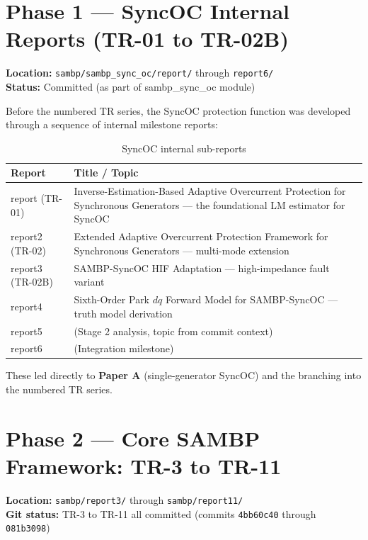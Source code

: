 \documentclass[11pt,a4paper]{article}
\begin{document}
\section{Phase 1 — SyncOC Internal Reports (TR-01 to TR-02B)}

\begin{phasebox}
\textbf{Location:} \texttt{sambp/sambp\_sync\_oc/report/} through \texttt{report6/}\\
\textbf{Status:} Committed (as part of sambp\_sync\_oc module)
\end{phasebox}

Before the numbered TR series, the SyncOC protection function was developed
through a sequence of internal milestone reports:

\begin{table}[h!]
\centering
\caption{SyncOC internal sub-reports}
\begin{tabular}{lp{10cm}}
\toprule
\textbf{Report} & \textbf{Title / Topic} \\
\midrule
report (TR-01) & Inverse-Estimation-Based Adaptive Overcurrent Protection for Synchronous Generators — the foundational LM estimator for SyncOC \\
report2 (TR-02) & Extended Adaptive Overcurrent Protection Framework for Synchronous Generators — multi-mode extension \\
report3 (TR-02B) & SAMBP-SyncOC HIF Adaptation — high-impedance fault variant \\
report4 & Sixth-Order Park $dq$ Forward Model for SAMBP-SyncOC — truth model derivation \\
report5 & (Stage 2 analysis, topic from commit context) \\
report6 & (Integration milestone) \\
\bottomrule
\end{tabular}
\end{table}

These led directly to \textbf{Paper A} (single-generator SyncOC) and the
branching into the numbered TR series.

\section{Phase 2 — Core SAMBP Framework: TR-3 to TR-11}

\begin{phasebox}
\textbf{Location:} \texttt{sambp/report3/} through \texttt{sambp/report11/}\\
\textbf{Git status:} TR-3 to TR-11 all committed (commits
\texttt{4bb60c40} through \texttt{081b3098})
\end{phasebox}
\end{document}
